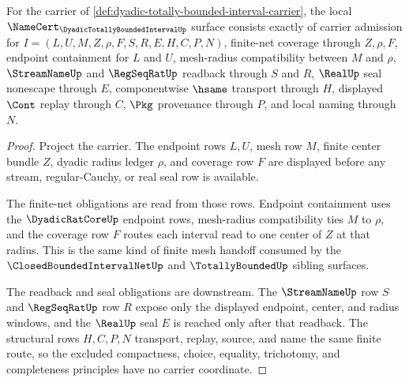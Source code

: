 \begin{theorem}
\label{thm:dyadic-totally-bounded-interval-namecert-obligations}
For the carrier of \autoref{def:dyadic-totally-bounded-interval-carrier}, the local $\NameCert_{\DyadicTotallyBoundedIntervalUp}$ surface consists exactly of carrier admission for $I=(L,U,M,Z,\rho,F,S,R,E,H,C,P,N)$, finite-net coverage through $Z,\rho,F$, endpoint containment for $L$ and $U$, mesh-radius compatibility between $M$ and $\rho$, $\StreamNameUp$ and $\RegSeqRatUp$ readback through $S$ and $R$, $\RealUp$ seal nonescape through $E$, componentwise $\hsame$ transport through $H$, displayed $\Cont$ replay through $C$, $\Pkg$ provenance through $P$, and local naming through $N$.
\end{theorem}
\begin{proof}
Project the carrier. The endpoint rows $L,U$, mesh row $M$, finite center bundle $Z$, dyadic radius ledger $\rho$, and coverage row $F$ are displayed before any stream, regular-Cauchy, or real seal row is available.

The finite-net obligations are read from those rows. Endpoint containment uses the $\DyadicRatCoreUp$ endpoint rows, mesh-radius compatibility ties $M$ to $\rho$, and the coverage row $F$ routes each interval read to one center of $Z$ at that radius. This is the same kind of finite mesh handoff consumed by the $\ClosedBoundedIntervalNetUp$ and $\TotallyBoundedUp$ sibling surfaces.

The readback and seal obligations are downstream. The $\StreamNameUp$ row $S$ and $\RegSeqRatUp$ row $R$ expose only the displayed endpoint, center, and radius windows, and the $\RealUp$ seal $E$ is reached only after that readback. The structural rows $H,C,P,N$ transport, replay, source, and name the same finite route, so the excluded compactness, choice, equality, trichotomy, and completeness principles have no carrier coordinate.
\end{proof}

